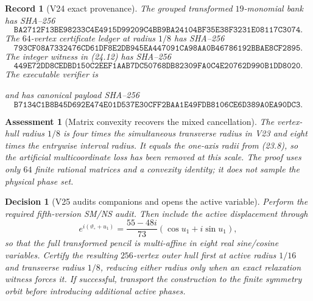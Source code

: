\documentclass[11pt,oneside]{article}
\newtheorem{assessment}[theorem]{Assessment}
\newtheorem{record}[theorem]{Record}
\newtheorem{decision}[theorem]{Decision}
\theoremstyle{definition}
\theoremstyle{remark}
\begin{document}
\begin{record}[V24 exact provenance]
\label{rec:newv24-provenance}
The grouped transformed \(19\)-monomial bank has SHA--256
\[
\texttt{BA2712F13BE98233C4E4915D99209C4BB9BA24104BF35E38F3231E08117C3074}.
                                                               \tag{24.13}
\]
The \(64\)-vertex certificate ledger at radius \(1/8\) has SHA--256
\[
\texttt{793CF08A7332476CD61DF8E2DB945EA447091CA98AA0B46786192BBAE8CF2895}.
                                                               \tag{24.14}
\]
The integer witness in (24.12) has SHA--256
\[
\texttt{449E72DD8CEDBD150C2EEF1AAB7DC50768DB82309FA0C4E20762D990B1DD8020}.
                                                               \tag{24.15}
\]
The executable verifier is
\begin{center}
\footnotesize
{}
\end{center}
and has canonical payload SHA--256
\[
\texttt{B7134C1B8B45D692E474E01D537E30CFF2BAA1E49FDB8106CE6D389A0EA90DC3}.
                                                               \tag{24.16}
\]
\end{record}

\begin{assessment}[Matrix convexity recovers the mixed cancellation]
\label{ass:newv24}
The vertex-hull radius \(1/8\) is four times the simultaneous
transverse radius in V23 and eight times the entrywise interval
radius.  It equals the one-axis radii from (23.8), so the artificial
multicoordinate loss has been removed at this scale.  The proof uses
only \(64\) finite rational matrices and a convexity identity; it
does not sample the physical phase set.
\end{assessment}

\begin{decision}[V25 audits companions and opens the active variable]
\label{dec:newv24-next}
Perform the required fifth-version SM/NS audit.  Then include the
active displacement through
\[
 e^{i(\vartheta_\circ+u_1)}
 =\frac{55-48i}{73}(\cos u_1+i\sin u_1),                 \tag{24.17}
\]
so that the full transformed pencil is multi-affine in eight real
sine/cosine variables.  Certify the resulting \(256\)-vertex
outer hull first at active radius \(1/16\) and transverse radius
\(1/8\), reducing either radius only when an exact relaxation
witness forces it.  If successful, transport the construction to
the finite symmetry orbit before introducing additional active
phases.
\end{decision}
\end{document}
